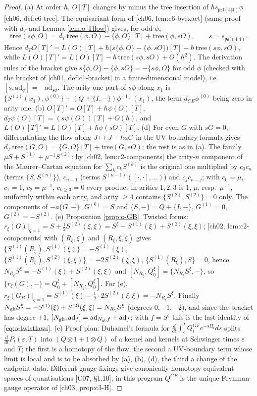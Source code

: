\begin{proof}
(a) At order $\hbar$, $O[T]$ changes by minus the tree insertion of $\hbar s_{\mathfrak{psl}(4|4)}\phi$ [ch06, def:c6-tree]. The equivariant form of [ch06, lem:c6-bvexact] (same proof with $d_T$ and Lemma \ref{lem:o-Tflow}) gives, for odd $\phi$,
\[
\mathrm{tree}(s\phi,O)=d_T\,\mathrm{tree}(\phi,O)-\{\phi,O\}[T]+\mathrm{tree}(\phi,sO),\qquad s=s_{\mathfrak{psl}(4|4)} .
\]
Hence $d_TO[T]'=L(O)[T]+\hbar\big(s\{\phi,O\}-\{\phi,sO\}\big)[T]-\hbar\,\mathrm{tree}(s\phi,sO)$, while $L(O)[T]'=L(O)[T]-\hbar\,\mathrm{tree}(s\phi,sO)+O(\hbar^2)$. The derivation rules of the bracket give $s\{\phi,O\}-\{\phi,sO\}=-\{s\phi,O\}$ for odd $\phi$ (checked with the bracket of [ch01, def:c1-bracket] in a finite-dimensional model), i.e.\ $[s,\mathrm{ad}_\phi]=-\mathrm{ad}_{s\phi}$. The arity-one part of $s\phi$ along $x_1$ is $\{S^{(1)}(x_1),\phi^{(0)}\}+(Q+\{I,-\})\phi^{(1)}(x_1)$, the term $d_{CE}\phi^{(0)}$ being zero in arity one. (b) $O[T]'=O[T]+\hbar\psi(O)[T]$, $d_T\psi(O)[T]=(s\psi(O))[T]+O(\hbar)$, and $L(O)[T]'=L(O)[T]+\hbar\psi(sO)[T]$. (d) For even $G$ with $sG=0$, differentiating the flow along $J\mapsto J-\hbar aG$ in the UV-boundary formula gives $d_T\,\mathrm{tree}(G,O)=\{G,O\}[T]+\mathrm{tree}(G,sO)$; the rest is as in (a). The family $\mu S+S^{(1)}+\mu^{-1}S^{(2)}$: by [ch02, lem:c2-components] the arity-$n$ component of the Maurer--Cartan equation for $\sum_kc_kS^{(k)}$ is the original one multiplied by $c_0c_n$ (terms $\{S,S^{(n)}\}$), $c_{n-1}$ (terms $S^{(n-1)}([\cdot,\cdot],\dots)$) and $c_jc_{n-j}$; with $c_0=\mu$, $c_1=1$, $c_2=\mu^{-1}$, $c_{k\ge3}=0$ every product in arities $1,2,3$ is $1$, $\mu$, resp.\ $\mu^{-1}$, uniformly within each arity, and arity $\ge4$ contains $\{S^{(2)},S^{(2)}\}=0$ only. The components of $-a\{G,-\}$: $G^{(0)}=S$ and $\{S,-\}=Q+\{I,-\}$, $G^{(1)}=0$, $G^{(2)}=-S^{(2)}$. (e) Proposition \ref{prop:o-GB}. Twisted forms: $r_\xi(G)|_{q=1}=S+\tfrac12S^{(2)}(\xi,\xi)=S^\xi-S^{(1)}(\xi)+S^{(2)}(\xi,\xi)$; [ch02, lem:c2-components] with $(R_\xi,\xi)$ and $(R_\xi,\xi,\xi)$ gives $\{S^{(1)}(R_\xi),S^{(1)}(\xi)\}=-S^{(1)}(\xi)$, $\{S^{(1)}(R_\xi),S^{(2)}(\xi,\xi)\}=-2S^{(2)}(\xi,\xi)$, $\{S^{(1)}(R_\xi),S\}=0$, hence $N_{R_\xi}S^\xi=-S^{(1)}(\xi)+S^{(2)}(\xi,\xi)$ and $[N_{R_\xi},Q_0^\xi]=\{N_{R_\xi}S^\xi,-\}$, so $\{r_\xi(G),-\}=Q_0^\xi+[N_{R_\xi},Q_0^\xi]$. For (e), $r_\xi(G_B)|_{q=1}=S^{(1)}(\xi)-\tfrac12\cdot2S^{(2)}(\xi,\xi)=-N_{R_\xi}S^\xi$. Finally $N_{\rm gh}S^\xi=-S^{(1)}(\xi)+S^{(2)}(\xi,\xi)=N_{R_\xi}S^\xi$ (degrees $0,-1,-2$), and since the bracket has degree $+1$, $[N_{\rm gh},\mathrm{ad}_f]=\mathrm{ad}_{N_{\rm gh}f}+\mathrm{ad}_f$; with $f=S^\xi$ this is the last identity of \eqref{eq:o-twistlaws}. (c) Proof plan: Duhamel's formula for $\frac{d}{dt}\int_\varepsilon^TQ^{GF}_te^{-sH_t}ds$ splits $\frac{d}{dt}P_t(\varepsilon,T)$ into $(Q\otimes1+1\otimes Q)$ of a kernel and kernels at Schwinger times $\varepsilon$ and $T$; the first is a homotopy of the flow, the second a UV-boundary term whose limit is local and is to be absorbed by (a), (b), (d), the third a change of the endpoint data. Different gauge fixings give canonically homotopy equivalent spaces of quantisations [C07, §1.10]; in this program $Q^{GF}$ is the unique Feynman-gauge operator of [ch03, prop:c3-H].

\end{proof}
